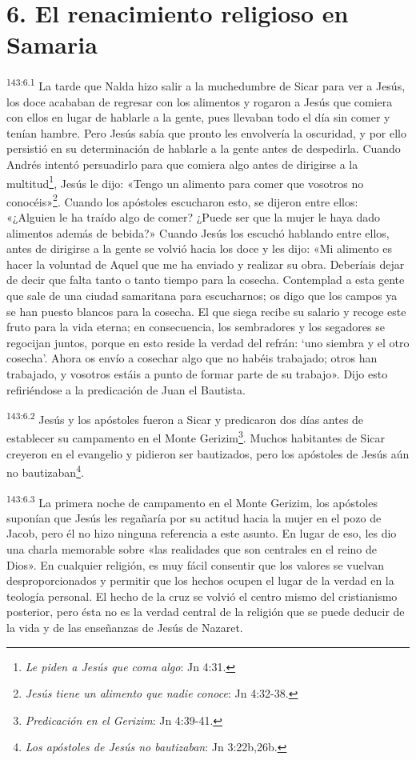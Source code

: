 \section*{6. El renacimiento religioso en Samaria}
\par
\textsuperscript{143:6.1} La tarde que Nalda hizo salir a la muchedumbre de Sicar para ver a Jesús, los doce acababan de regresar con los alimentos y rogaron a Jesús que comiera con ellos en lugar de hablarle a la gente, pues llevaban todo el día sin comer y tenían hambre. Pero Jesús sabía que pronto les envolvería la oscuridad, y por ello persistió en su determinación de hablarle a la gente antes de despedirla. Cuando Andrés intentó persuadirlo para que comiera algo antes de dirigirse a la multitud\footnote{\textit{Le piden a Jesús que coma algo}: Jn 4:31.}, Jesús le dijo: «Tengo un alimento para comer que vosotros no conocéis»\footnote{\textit{Jesús tiene un alimento que nadie conoce}: Jn 4:32-38.}. Cuando los apóstoles escucharon esto, se dijeron entre ellos: «¿Alguien le ha traído algo de comer? ¿Puede ser que la mujer le haya dado alimentos además de bebida?» Cuando Jesús los escuchó hablando entre ellos, antes de dirigirse a la gente se volvió hacia los doce y les dijo: «Mi alimento es hacer la voluntad de Aquel que me ha enviado y realizar su obra. Deberíais dejar de decir que falta tanto o tanto tiempo para la cosecha. Contemplad a esta gente que sale de una ciudad samaritana para escucharnos; os digo que los campos ya se han puesto blancos para la cosecha. El que siega recibe su salario y recoge este fruto para la vida eterna; en consecuencia, los sembradores y los segadores se regocijan juntos, porque en esto reside la verdad del refrán: `uno siembra y el otro cosecha'. Ahora os envío a cosechar algo que no habéis trabajado; otros han trabajado, y vosotros estáis a punto de formar parte de su trabajo». Dijo esto refiriéndose a la predicación de Juan el Bautista.

\par
\textsuperscript{143:6.2} Jesús y los apóstoles fueron a Sicar y predicaron dos días antes de establecer su campamento en el Monte Gerizim\footnote{\textit{Predicación en el Gerizim}: Jn 4:39-41.}. Muchos habitantes de Sicar creyeron en el evangelio y pidieron ser bautizados, pero los apóstoles de Jesús aún no bautizaban\footnote{\textit{Los apóstoles de Jesús no bautizaban}: Jn 3:22b,26b.}.

\par
\textsuperscript{143:6.3} La primera noche de campamento en el Monte Gerizim, los apóstoles suponían que Jesús les regañaría por su actitud hacia la mujer en el pozo de Jacob, pero él no hizo ninguna referencia a este asunto. En lugar de eso, les dio una charla memorable sobre «las realidades que son centrales en el reino de Dios». En cualquier religión, es muy fácil consentir que los valores se vuelvan desproporcionados y permitir que los hechos ocupen el lugar de la verdad en la teología personal. El hecho de la cruz se volvió el centro mismo del cristianismo posterior, pero ésta no es la verdad central de la religión que se puede deducir de la vida y de las enseñanzas de Jesús de Nazaret.

